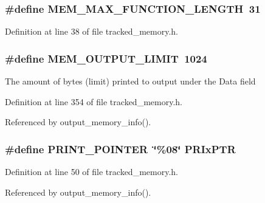 \subsubsection[{M\-E\-M\-\_\-\-M\-A\-X\-\_\-\-F\-U\-N\-C\-T\-I\-O\-N\-\_\-\-L\-E\-N\-G\-T\-H}]{\setlength{\rightskip}{0pt plus 5cm}\#define M\-E\-M\-\_\-\-M\-A\-X\-\_\-\-F\-U\-N\-C\-T\-I\-O\-N\-\_\-\-L\-E\-N\-G\-T\-H~31}\label{tracked__memory_8h_af15f994b428f827c19ae31d1df47d7ca}


Definition at line 38 of file tracked\-\_\-memory.\-h.

\subsubsection[{M\-E\-M\-\_\-\-O\-U\-T\-P\-U\-T\-\_\-\-L\-I\-M\-I\-T}]{\setlength{\rightskip}{0pt plus 5cm}\#define M\-E\-M\-\_\-\-O\-U\-T\-P\-U\-T\-\_\-\-L\-I\-M\-I\-T~1024}\label{tracked__memory_8h_aa041ffb2d12d9cd00022df58acb31c92}
The amount of bytes (limit) printed to output under the Data field 

Definition at line 354 of file tracked\-\_\-memory.\-h.



Referenced by output\-\_\-memory\-\_\-info().

\subsubsection[{P\-R\-I\-N\-T\-\_\-\-P\-O\-I\-N\-T\-E\-R}]{\setlength{\rightskip}{0pt plus 5cm}\#define P\-R\-I\-N\-T\-\_\-\-P\-O\-I\-N\-T\-E\-R~\char`\"{}\%08\char`\"{} P\-R\-Ix\-P\-T\-R}\label{tracked__memory_8h_a8aa19886dfd5381ab173d9fcfec3e01d}


Definition at line 50 of file tracked\-\_\-memory.\-h.



Referenced by output\-\_\-memory\-\_\-info().

